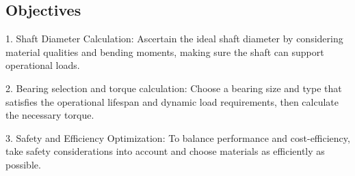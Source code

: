 \documentclass[../../main]{subfiles}
\begin{document}





\subsection{Objectives}

1. Shaft Diameter Calculation: Ascertain the ideal shaft diameter by
considering material qualities and bending moments, making sure the
shaft can support operational loads.

2. Bearing selection and torque calculation: Choose a bearing size and
type that satisfies the operational lifespan and dynamic load
requirements, then calculate the necessary torque.

3. Safety and Efficiency Optimization: To balance performance and
cost-efficiency, take safety considerations into account and choose
materials as efficiently as possible.
\end{document}

